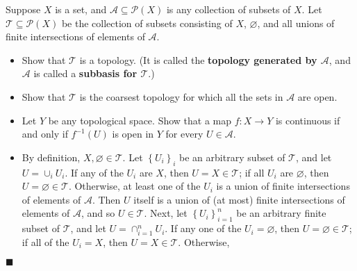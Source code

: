 \documentclass[12pt]{article}
\renewcommand{\qed}{\hfill$\blacksquare$}
\renewenvironment{proof}{\begin{addmargin}[1em]{0em}\begin{newproof}}{\end{newproof}\end{addmargin}\qed}
\newenvironment{problem}[2][Problem]{\begin{trivlist}
\item[\hskip \labelsep {\bfseries #1}\hskip \labelsep {\bfseries #2.}]}{\end{trivlist}}
\begin{document}
\begin{problem}{2-12}
Suppose $X$ is a set, and $\mathcal{A}\subseteq \mathcal{P}\left(X\right)$ is any collection of subsets of $X$. Let $\mathcal{T}\subseteq \mathcal{P}\left(X\right)$ be the collection of subsets consisting of $X$, $\varnothing$, and all unions of finite intersections of elements of $\mathcal{A}$.
\begin{itemize}
	\item Show that $\mathcal{T}$ is a topology. (It is called the \textbf{topology generated by $\mathcal{A}$}, and $\mathcal{A}$ is called a \textbf{subbasis for $\mathcal{T}$}.)
	\item Show that $\mathcal{T}$ is the coarsest topology for which all the sets in $\mathcal{A}$ are open.
	\item Let $Y$ be any topological space. Show that a map $f:X\rightarrow Y$ is continuous if and only if $f^{-1}\left(U\right)$ is open in $Y$ for every $U\in \mathcal{A}$.
\end{itemize}
\end{problem}
\begin{proof}
\begin{itemize}
	\item By definition, $X,\varnothing \in \mathcal{T}$. Let $\left\{U_i\right\}_i$ be an arbitrary subset of $\mathcal{T}$, and let $U = \cup_i U_i$. If any of the $U_i$ are $X$, then $U=X \in \mathcal{T}$; if all $U_i$ are $\varnothing$, then $U = \varnothing \in \mathcal{T}$. Otherwise, at least one of the $U_i$ is a union of finite intersections of elements of $\mathcal{A}$. Then $U$ itself is a union of (at most) finite intersections of elements of $\mathcal{A}$, and so $U \in \mathcal{T}$. Next, let $\left\{U_i\right\}_{i=1}^n$ be an arbitrary finite subset of $\mathcal{T}$, and let $U = \cap_{i=1}^n U_i$. If any one of the $U_i=\varnothing$, then $U = \varnothing \in \mathcal{T}$; if all of the $U_i = X$, then $U=X\in \mathcal{T}$. Otherwise,
\end{itemize}
\end{proof}
\end{document}
